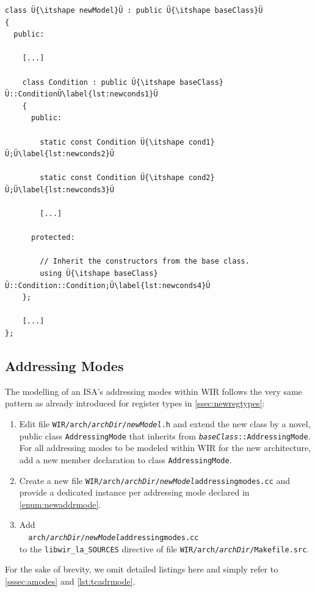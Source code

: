 \begin{lstlisting}[style=code,float=t,caption={Declaration of a New Processor Model's Condition Fields},label=lst:newconds]
class Ü{\itshape newModel}Ü : public Ü{\itshape baseClass}Ü
{
  public:

    [...]

    class Condition : public Ü{\itshape baseClass}Ü::ConditionÜ\label{lst:newconds1}Ü
    {
      public:

        static const Condition Ü{\itshape cond1}Ü;Ü\label{lst:newconds2}Ü

        static const Condition Ü{\itshape cond2}Ü;Ü\label{lst:newconds3}Ü

        [...]

      protected:

        // Inherit the constructors from the base class.
        using Ü{\itshape baseClass}Ü::Condition::Condition;Ü\label{lst:newconds4}Ü
    };

    [...]
};
\end{lstlisting}


\subsection{Addressing Modes}
\label{ssec:newamodes}

The modelling of an \gls{ISA}'s addressing modes within \gls{WIR} follows the very same pattern as already introduced for register types in \cref{ssec:newregtypes}:
\begin{enumerate}[resume]
  \item Edit file \texttt{WIR/arch/{\itshape archDir}/{\itshape newModel}.h} and extend the new class by a novel, public class \texttt{Addressing\-Mode} that inherits from \texttt{{\itshape baseClass}::AddressingMode}.
  For all addressing modes to be modeled within \gls{WIR} for the new architecture, add a new member declaration to class \texttt{AddressingMode}.\label{enum:newaddrmode}

  \item Create a new file \texttt{WIR/arch/{\itshape archDir}/{\itshape newModel}addressingmodes.cc} and provide a dedicated instance per addressing mode declared in \cref{enum:newaddrmode}.

  \item Add \\
  \verb|  arch/|\texttt{\itshape archDir}\verb|/|\texttt{\itshape newModel}\verb|addressingmodes.cc| \\
  to the \texttt{libwir\_la\_SOURCES} directive of file \texttt{WIR/arch/{\itshape archDir}/Makefile.src}.
\end{enumerate}
For the sake of brevity, we omit detailed listings here and simply refer to \cref{sssec:amodes} and \cref{lst:tcadrmode}.


